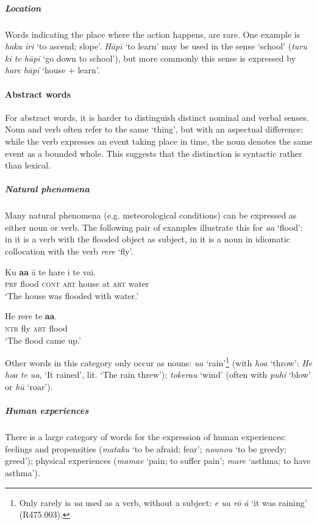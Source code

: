 \subparagraph{Location} Words indicating the place where the action happens, are rare. One example is \textit{haka iri} ‘to ascend; slope’. \textit{Hāpī} ‘to learn’ may be used in the sense ‘school’ (\textit{turu ki te hāpī} ‘go down to school’), but more commonly this sense is expressed by \textit{hare} \textit{hāpī} ‘house + learn’. 

\paragraph{Abstract words}\label{sec:3.2.2.1.2} For abstract words, it is harder to distinguish distinct nominal and verbal senses. Noun and verb often refer to the same ‘thing’, but with an aspectual difference: while the verb expresses an event taking place in time, the noun denotes the same event as a bounded whole. This suggests that the distinction is syntactic rather than lexical. 

\subparagraph{Natural phenomena} Many natural phenomena (e.g. meteorological conditions) can be expressed as either noun or verb. The following pair of examples illustrate this for \textit{a{\ꞌ}a} ‘flood’: in  it is a verb with the flooded object as subject, in  it is a noun in idiomatic collocation with the verb \textit{rere} ‘fly’.

\ea\label{ex:3.12}
\gll Ku \textbf{a{\ꞌ}a} {\ꞌ}ā te hare {\ꞌ}i te vai.\\
\textsc{prf} flood \textsc{cont} \textsc{art} house at \textsc{art} water\\

\glt 
‘The house was flooded with water.’ \textstyleExampleref{[Egt]}
\z

\ea\label{ex:3.13}
\gll He rere te \textbf{a{\ꞌ}a}. \\
\textsc{ntr} fly \textsc{art} flood \\

\glt
‘The flood came up.’ \textstyleExampleref{[Mtx-7-17.012]}
\z

Other words in this category only occur as nouns: \textit{{\ꞌ}ua} ‘rain’\footnote{\label{fn:101}Only rarely is \textit{{\ꞌ}ua} used as a verb, without a subject: \textit{e {\ꞌ}ua rō {\ꞌ}ā} ‘it was raining’ (R475.003).} (with \textit{hoa} ‘throw’: \textit{He hoa te {\ꞌ}ua}, ‘It rained’, lit. ‘The rain threw’); \textit{tokerau} ‘wind’ (often with \textit{puhi} ‘blow’ or \textit{hū} ‘roar’).

{\sloppy
\subparagraph{Human experiences} There is a large category of words for the expression of \mbox{human} experiences: feelings and propensities (\textit{mataku} ‘to be afraid; fear’; \textit{nounou} ‘to be greedy; greed’); physical experiences (\textit{mamae} ‘pain; to suffer pain’; \textit{mare} ‘asthma; to have asth\-ma’).
}

